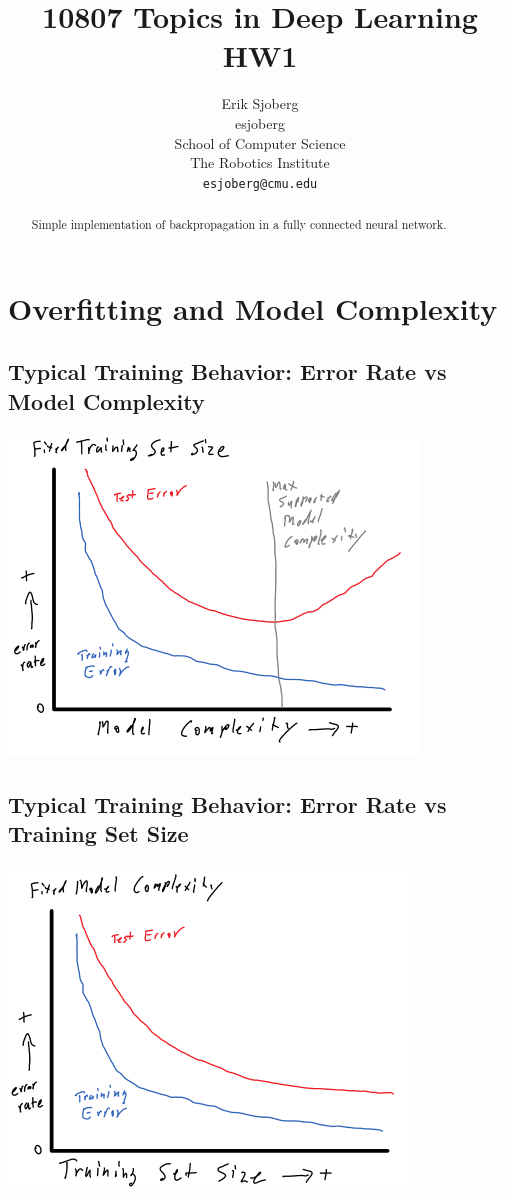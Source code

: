 \documentclass{article}
\title{10807 Topics in Deep Learning HW1}
\author{
  Erik Sjoberg\\
  esjoberg\\
  School of Computer Science\\
  The Robotics Institute\\
  \texttt{esjoberg@cmu.edu} \\
}
\begin{document}

\maketitle

\begin{abstract}
  Simple implementation of backpropagation in a fully connected neural network.
\end{abstract}

\section{Overfitting and Model Complexity}

\subsection{Typical Training Behavior: Error Rate vs Model Complexity}
\includegraphics[scale=0.6]{error_vs_modelcomplexity.png} 

\subsection{Typical Training Behavior: Error Rate vs Training Set Size}
\includegraphics[scale=0.6]{error_vs_trainsetsize.png} 
\end{document}
